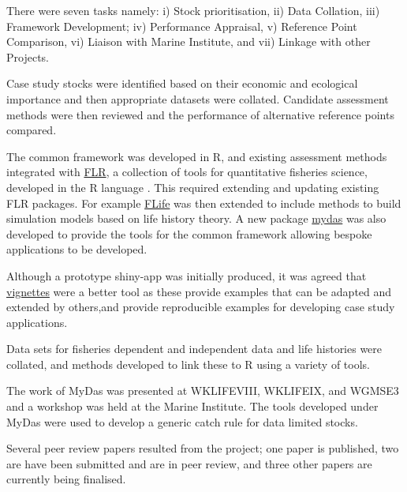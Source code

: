 There were seven tasks namely: i) Stock prioritisation, ii) Data Collation, iii) Framework Development; iv) Performance Appraisal, v) Reference Point Comparison, vi) Liaison with Marine Institute, and vii) Linkage with other Projects. 

Case study stocks were identified based on their economic and ecological importance and then appropriate datasets were collated. Candidate assessment methods were then reviewed and the performance of alternative reference points compared. 

The common framework was developed in R, and existing assessment methods integrated with \href{http://www.flr-project.org/}{FLR}, a collection of tools for quantitative fisheries science, developed in the R language \citep{kell2007flr}. This required extending and updating existing FLR packages. For example \href{https://github.com/flr/flife}{FLife}
was then extended to include methods to build simulation models based on life history theory. A new package \href{https://github.com/flr/mydas/wiki}{mydas} was also developed to provide the tools for the common framework allowing bespoke applications to be developed.
 
Although a prototype shiny-app was initially produced, it was agreed that \href{https://3o2y9wugzp1kfxr5hvzgzq-on.drv.tw/MyDas/doc/html/mydas_vignettes.html}{vignettes} were a better tool as these provide examples that can be adapted and extended by others,and provide reproducible examples for developing case study applications.

Data sets for fisheries dependent and independent data and life histories were collated, and methods developed to link these to R using a variety of tools.

The work of MyDas was presented at WKLIFEVIII, WKLIFEIX, and WGMSE3 and a workshop was held at the Marine Institute. The tools developed under MyDas were used to develop a generic catch rule for data limited stocks.

Several peer review papers resulted from the project;  one paper is published, two are have been submitted and are in peer review, and three other papers are currently being finalised.

